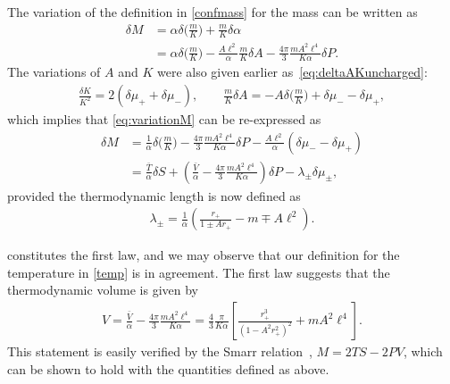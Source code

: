 \documentclass[
twoside,
openright,
frontopenright,
]{dmathesis}
\newcommand{\nn}{\nonumber}
\begin{document}
The variation of the definition in \cref{confmass} for the mass can be written
as
\begin{align}
  \label{eq:variationM}
  \delta M &= \alpha \delta \Big(\frac{m}{K}\Big) + \frac{m}{K}\delta \alpha\nn\\
           &= \alpha \delta \Big(\frac{m}{K}\Big) - \frac{A\ell^2}{\alpha}\frac{m}{K}\delta A - \frac{4\pi}{3} \frac{mA^2\ell^4}{K\alpha} \delta P. 
\end{align}
The variations of $A$ and $K$ were also given earlier
as~\eqref{eq:deltaAKuncharged}:
\begin{align}
  \frac{\delta K}{K^2} = 2  ( \delta \mu_+ + \delta \mu_-  ), \qquad \frac{m}{K}
  \delta A = - A \delta \Big(\frac{m}{K}\Big)  
 + \delta \mu_- - \delta \mu_+,
\end{align}
which implies that \cref{eq:variationM} can be re-expressed as
\begin{align}
  \label{eq:finalfirstlaw}
  \delta M & = \frac{1}{\alpha} \delta\Big(\frac{m}{K}\Big) - \frac{4\pi}{3}
             \frac{mA^2\ell^4}{K\alpha} \delta P -
             \frac{A\ell^2}{\alpha}(\delta\mu_- - \delta\mu_+)\nn\\
           &=\frac{\bar{T}}{\alpha}\delta S + \left(\frac{\bar{V}}{\alpha}-
             \frac{4\pi}{3} \frac{mA^2\ell^4}{K\alpha}\right) \delta P -
             \lambda_\pm \delta\mu_\pm,
\end{align}
provided the thermodynamic length is now defined as
\begin{align}
  \lambda_\pm = \frac{1}{\alpha}\left(\frac{r_+}{1\pm Ar_+}-m \mp A\ell^2\right).
\end{align}

 constitutes the first law, and we may observe that our
definition for the temperature in \cref{temp} is in agreement. The first law
suggests that the thermodynamic volume is given by
\begin{align}\label{vol}
  V = \frac{\bar{V}}{\alpha} - \frac{4\pi}{3} \frac{mA^2\ell^4}{K\alpha} =
  \frac{4}{3}\frac{\pi}{K \alpha}\left[\frac{r_+^3}{(1-A^2r_+^2)^2} 
  +mA^2\ell^4\right].
\end{align}
This statement is easily verified by the Smarr relation~\cite{Smarr:1972kt},
$M = 2 TS - 2PV$, which can be shown to hold with the quantities defined as
above.
\end{document}
